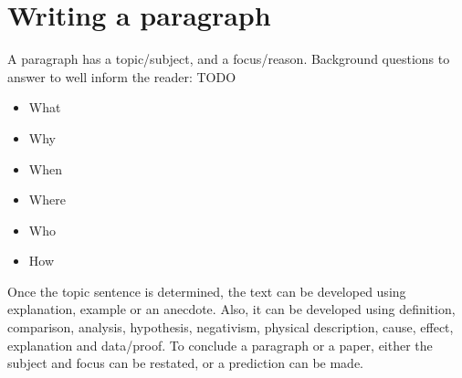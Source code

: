 \documentclass[10pt, twocolumn]{article}
\begin{document}
\section{Writing a paragraph}
A paragraph has a topic/subject, and a focus/reason.
Background questions to answer to well inform the reader: TODO
\begin{itemize}
  \item What
  \item Why
  \item When
  \item Where
  \item Who
  \item How
\end{itemize}

Once the topic sentence is determined, the text can be developed using explanation, example or an anecdote.
Also, it can be developed using definition, comparison, analysis, hypothesis, negativism, physical description, cause, effect, explanation and data/proof.
To conclude a paragraph or a paper, either the subject and focus can be restated, or a prediction can be made.
\end{document}
